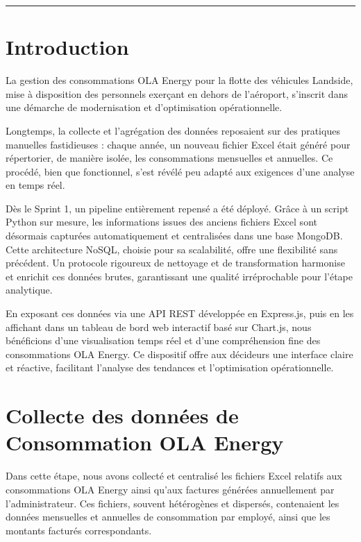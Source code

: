 \documentclass[a4paper,11pt]{report}
\begin{document}
\vfill
\begin{center}
  \color{blue!60!black}\rule{0.6\textwidth}{0.8pt}
\end{center}

\newpage
\setcounter{section}{0}

\section{Introduction}

La gestion des consommations OLA Energy pour la flotte des véhicules Landside, mise à disposition des personnels exerçant en dehors de l’aéroport, s’inscrit dans une démarche de modernisation et d’optimisation opérationnelle.

Longtemps, la collecte et l’agrégation des données reposaient sur des pratiques manuelles fastidieuses : chaque année, un nouveau fichier Excel était généré pour répertorier, de manière isolée, les consommations mensuelles et annuelles. Ce procédé, bien que fonctionnel, s’est révélé peu adapté aux exigences d’une analyse en temps réel.

Dès le Sprint 1, un pipeline entièrement repensé a été déployé. Grâce à un script Python sur mesure, les informations issues des anciens fichiers Excel sont désormais capturées automatiquement et centralisées dans une base MongoDB. Cette architecture NoSQL, choisie pour sa scalabilité, offre une flexibilité sans précédent. Un protocole rigoureux de nettoyage et de transformation harmonise et enrichit ces données brutes, garantissant une qualité irréprochable pour l’étape analytique.

En exposant ces données via une API REST développée en Express.js, puis en les affichant dans un tableau de bord web interactif basé sur Chart.js, nous bénéficions d’une visualisation temps réel et d’une compréhension fine des consommations OLA Energy. Ce dispositif offre aux décideurs une interface claire et réactive, facilitant l’analyse des tendances et l’optimisation opérationnelle.


\section{Collecte des données de Consommation OLA Energy}

Dans cette étape, nous avons collecté et centralisé les fichiers Excel relatifs aux consommations OLA Energy ainsi qu’aux factures générées annuellement par l’administrateur. Ces fichiers, souvent hétérogènes et dispersés, contenaient les données mensuelles et annuelles de consommation par employé, ainsi que les montants facturés correspondants.
\end{document}
